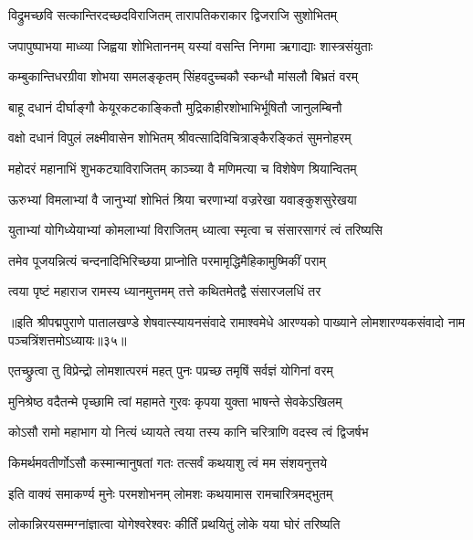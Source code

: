 \twolineshloka
{विद्रुमच्छवि सत्कान्तिरदच्छदविराजितम्}
{तारापतिकराकार द्विजराजि सुशोभितम्}%

\twolineshloka
{जपापुष्पाभया माध्व्या जिह्वया शोभिताननम्}
{यस्यां वसन्ति निगमा ऋगाद्याः शास्त्रसंयुताः}%

\twolineshloka
{कम्बुकान्तिधरग्रीवा शोभया समलङ्कृतम्}
{सिंहवदुच्चकौ स्कन्धौ मांसलौ बिभ्रतं वरम्}%

\twolineshloka
{बाहू दधानं दीर्घाङ्गौ केयूरकटकाङ्कितौ}
{मुद्रिकाहीरशोभाभिर्भूषितौ जानुलम्बिनौ}%

\twolineshloka
{वक्षो दधानं विपुलं लक्ष्मीवासेन शोभितम्}
{श्रीवत्सादिविचित्राङ्कैरङ्कितं सुमनोहरम्}%

\twolineshloka
{महोदरं महानाभिं शुभकट्याविराजितम्}
{काञ्च्या वै मणिमत्या च विशेषेण श्रियान्वितम्}%

\twolineshloka
{ऊरुभ्यां विमलाभ्यां वै जानुभ्यां शोभितं श्रिया}
{चरणाभ्यां वज्ररेखा यवाङ्कुशसुरेखया}%

\twolineshloka
{युताभ्यां योगिध्येयाभ्यां कोमलाभ्यां विराजितम्}
{ध्यात्वा स्मृत्वा च संसारसागरं त्वं तरिष्यसि}%

\twolineshloka
{तमेव पूजयन्नित्यं चन्दनादिभिरिच्छया}
{प्राप्नोति परमामृद्धिमैहिकामुष्मिकीं पराम्}%

\twolineshloka
{त्वया पृष्टं महाराज रामस्य ध्यानमुत्तमम्}
{तत्ते कथितमेतद्वै संसारजलधिं तर}%

{॥इति श्रीपद्मपुराणे पातालखण्डे शेषवात्स्यायनसंवादे रामाश्वमेधे आरण्यको पाख्याने लोमशारण्यकसंवादो नाम पञ्चत्रिंशत्तमोऽध्यायः॥३५॥}



\twolineshloka
{एतच्छ्रुत्वा तु विप्रेन्द्रो लोमशात्परमं महत्}
{पुनः पप्रच्छ तमृषिं सर्वज्ञं योगिनां वरम्}%


\twolineshloka
{मुनिश्रेष्ठ वदैतन्मे पृच्छामि त्वां महामते}
{गुरवः कृपया युक्ता भाषन्ते सेवकेऽखिलम्}%

\twolineshloka
{कोऽसौ रामो महाभाग यो नित्यं ध्यायते त्वया}
{तस्य कानि चरित्राणि वदस्व त्वं द्विजर्षभ}%

\twolineshloka
{किमर्थमवतीर्णोऽसौ कस्मान्मानुषतां गतः}
{तत्सर्वं कथयाशु त्वं मम संशयनुत्तये}%


\twolineshloka
{इति वाक्यं समाकर्ण्य मुनेः परमशोभनम्}
{लोमशः कथयामास रामचारित्रमद्भुतम्}%

\twolineshloka
{लोकान्निरयसम्मग्नांज्ञात्वा योगेश्वरेश्वरः}
{कीर्तिं प्रथयितुं लोके यया घोरं तरिष्यति}%

